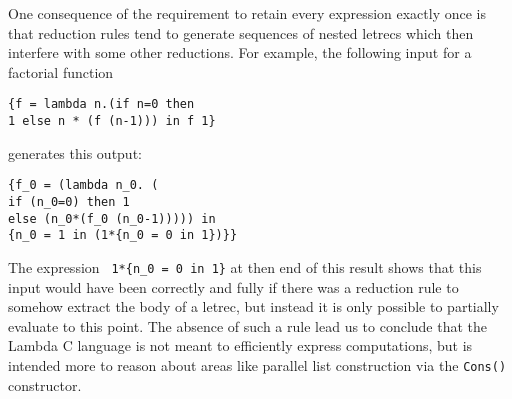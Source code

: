 \documentclass[preprint, 10pt]{sigplanconf}
\begin{document}
One consequence of the requirement to retain every expression exactly once is that reduction rules tend to generate sequences of nested letrecs  which then interfere with some other reductions. For example, the following input for a factorial function
\begin{verbatim}
{f = lambda n.(if n=0 then 
1 else n * (f (n-1))) in f 1}
\end{verbatim}
generates  this output:
\begin{verbatim}
{f_0 = (lambda n_0. (
if (n_0=0) then 1 
else (n_0*(f_0 (n_0-1))))) in 
{n_0 = 1 in (1*{n_0 = 0 in 1})}}
\end{verbatim}

The  expression \verb# 1*{n_0 = 0 in 1}# at then end of this result shows that this input would have been correctly and fully if there was a reduction rule to somehow extract the body of a letrec, but instead it is only possible to partially evaluate to this point. The absence of such a rule lead us to conclude that the Lambda C language  is not meant to efficiently express computations, but is intended more to reason about areas like parallel list construction via the \verb#Cons()# constructor.






\end{document}
